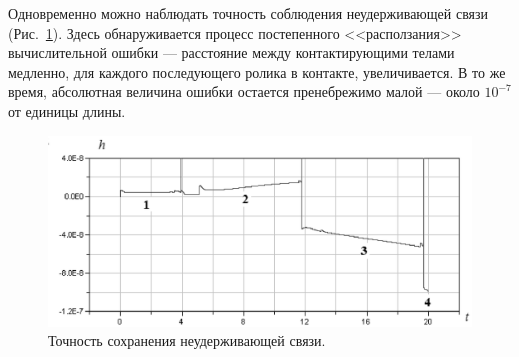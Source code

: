 Одновременно можно наблюдать точность соблюдения неудерживающей связи 
(Рис.~\ref{fig2}). Здесь обнаруживается процесс постепенного <<расползания>>
вычислительной ошибки --- расстояние между контактирующими телами медленно, для
каждого последующего ролика в контакте, увеличивается. В то же время, 
абсолютная величина ошибки остается пренебрежимо малой --- около $10^{-7}$
от единицы длины.

\begin{figure}[htb]
\centerline{\includegraphics[width=15cm]{content/parts/3_friction/nd/Figure21.eps}}
\caption{Точность сохранения неудерживающей связи.}
\label{fig2}
\end{figure}
